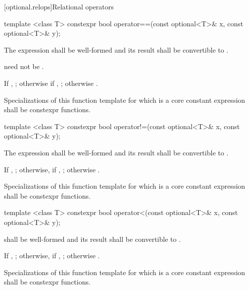 [optional.relops]{Relational operators}

%
\begin{itemdecl}
template <class T> constexpr bool operator==(const optional<T>& x, const optional<T>& y);
\end{itemdecl}

\begin{itemdescr}
\pnum
\requires
The expression  shall be well-formed and
its result shall be convertible to .
\begin{note}  need not be . \end{note}

\pnum
\returns
If , ; otherwise if , ; otherwise .

\pnum
\remarks
Specializations of this function template
for which  is a core constant expression
shall be constexpr functions.
\end{itemdescr}

%
\begin{itemdecl}
template <class T> constexpr bool operator!=(const optional<T>& x, const optional<T>& y);
\end{itemdecl}

\begin{itemdescr}
\pnum
\requires
The expression  shall be well-formed and
its result shall be convertible to .

\pnum
\returns
If , ;
otherwise, if , ;
otherwise .

\pnum
\remarks
Specializations of this function template
for which  is a core constant expression
shall be constexpr functions.
\end{itemdescr}

%
\begin{itemdecl}
template <class T> constexpr bool operator<(const optional<T>& x, const optional<T>& y);
\end{itemdecl}

\begin{itemdescr}
\pnum
\requires
{} shall be well-formed
and its result shall be convertible to .

\pnum
\returns
If , ;
otherwise, if , ;
otherwise .

\pnum
\remarks
Specializations of this function template
for which  is a core constant expression
shall be constexpr functions.
\end{itemdescr}

